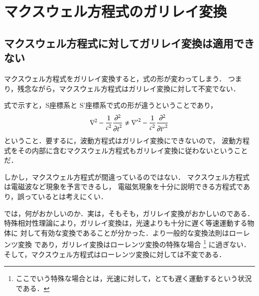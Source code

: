 ﻿%
    \section{マクスウェル方程式のガリレイ変換}
        \subsection{マクスウェル方程式に対してガリレイ変換は適用できない}
            マクスウェル方程式をガリレイ変換すると，式の形が変わってしまう．
            つまり，残念ながら，マクスウェル方程式はガリレイ変換に対して不変でない．

            式で示すと，S座標系と S'座標系で式の形が違うということであり，
                \[
                {\nabla}^{2} -\frac{1}{{c}^{2}}\frac{{\partial}^{2}}{{\partial t}^{2}}
                \neq
                {\nabla '}^{2} -\frac{1}{{c}^{2}}\frac{{\partial}^{2}}{{\partial t'}^{2}}
                \]
            ということ．要するに，波動方程式はガリレイ変換にできないので，
            波動方程式をその内部に含むマクスウェル方程式もガリレイ変換に従わないということだ．

            しかし，マクスウェル方程式が間違っているのではない．
            マクスウェル方程式は電磁波など現象を予言できるし，
            電磁気現象を十分に説明できる方程式であり，誤っているとは考えにくい．

            では，何がおかしいのか．実は，そもそも，ガリレイ変換がおかしいのである．
            特殊相対性理論により，ガリレイ変換は，光速よりも十分に遅く等速運動する物体に
            対して有効な変換であることが分かった．より一般的な変換法則はローレンツ変換
            であり，ガリレイ変換はローレンツ変換の特殊な場合
                \footnote{
                    ここでいう特殊な場合とは，光速に対して，とても遅く運動するという状況である．
                }
            に過ぎない．そして，マクスウェル方程式はローレンツ変換に対しては不変である．

